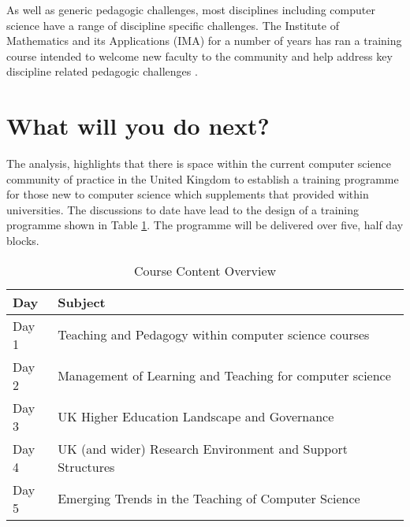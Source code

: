 \documentclass[sigconf]{acmart}
\begin{document}
As well as generic pedagogic challenges, most disciplines including computer science have a range of discipline specific challenges. The Institute of Mathematics and its Applications (IMA) for a number of years has ran a training course intended to welcome new faculty to the community and help address key discipline related pedagogic challenges \cite{IMA}.

\section{What will you do next?}

The analysis, highlights that there is space within the current computer science community of practice in the United Kingdom to establish a training programme for those new to computer science which supplements that provided within universities. The discussions to date have lead to the design of a training programme shown in Table \ref{tab:table1}. The programme will be delivered over five, half day blocks. 
\begin{table}[h]
\begin{tabular}{|p{0.3in}|p{2.8in}|}
\hline
Day   & Subject                                                      \\ \hline
Day 1 & Teaching and Pedagogy within computer science courses        \\ \hline
Day 2 & Management of Learning and Teaching for computer   science   \\ \hline
Day 3 & UK Higher Education Landscape and Governance                 \\ \hline
Day 4 & UK (and wider) Research Environment and Support   Structures \\ \hline
Day 5 & Emerging Trends in the Teaching of Computer Science          \\ \hline
\end{tabular}
\caption{Course Content Overview}
\label{tab:table1}
\end{table}
\end{document}
